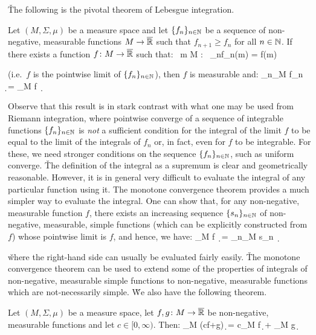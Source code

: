 \v

The following is the pivotal theorem of Lebesgue integration.

Let $(M,\Sigma,\mu)$ be a measure space and let $\{f_n\}_{n\in\mathbb{N}}$ be a sequence of non-negative, measurable
functions $M\to\overline{\mathbb{R}}$ such that $f_{n+1}\geq f_n$ for all $n\in \mathbb{N}$. If there exists a function $f\colon M\to
\overline{\mathbb{R}}$ such that:
\bse
\forall \, m \in M : \ \lim_{n\to\infty}f_n(m) = f(m)
\ese

(i.e.\ $f$ is the pointwise limit of $\{f_n\}_{n\in\mathbb{N}}$), then $f$ is measurable and:
\bse
\lim_{n\to\infty}\int_M\! f_n \, \d \mu = \int_M\! f \, \d \mu
\ese
\et

Observe that this result is in stark contrast with what one may be used from Riemann integration, where pointwise
converge of a sequence of integrable functions $\{f_n\}_{n\in\mathbb{N}}$ is \emph{not} a sufficient condition for the
integral of the limit $f$ to be equal to the limit of the integrals of $f_n$ or, in fact, even for $f$ to be
integrable. For these, we need stronger conditions on the sequence $\{f_n\}_{n\in\mathbb{N}}$, such as uniform converge. \v

The definition of the integral as a supremum is clear and geometrically reasonable. However, it is in general very
difficult to evaluate the integral of any particular function using it. The monotone convergence theorem provides a
much simpler way to evaluate the integral. One can show that, for any non-negative, measurable function $f$, there
exists an increasing sequence $\{s_n\}_{n\in\mathbb{N}}$ of non-negative, measurable, simple functions (which can be
explicitly constructed from $f$) whose pointwise limit is $f$, and hence, we have:
\bse
\int_M\! f \, \d \mu = \lim_{n\to\infty}\int_M\! s_n \, \d \mu
\ese

\v

where the right-hand side can usually be evaluated fairly easily. \v

The monotone convergence theorem can be used to extend some of the properties of integrals of non-negative, measurable
simple functions to non-negative, measurable functions which are not-necessarily simple. \v

We also have the following theorem.

\bt[]
Let $(M,\Sigma,\mu)$ be a measure space, let $f,g\colon M\to \overline{\mathbb{R}}$ be non-negative, measurable functions and
let $c\in [0,\infty)$. Then:
\bse
\displaystyle \int_{M}\! (cf+g) \,\d \mu = c\int_{M}\! f \,\d \mu + \int_{M}\! g \,\d \mu
\ese
\et

